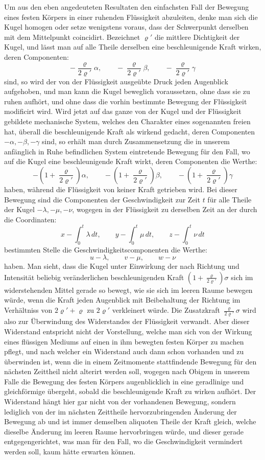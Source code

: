 \documentclass[11pt]{article}
\begin{document}
Um aus den eben angedeuteten Resultaten den einfachsten Fall der Bewegung eines festen Körpers in einer ruhenden Flüssigkeit abzuleiten, denke man sich die Kugel homogen oder setze wenigstens voraus, dass der Schwerpunkt derselben mit dem Mittelpunkt coincidirt. Bezeichnet $\varrho'$ die mittlere Dichtigkeit der Kugel, und lässt man auf alle Theile derselben eine beschleunigende Kraft wirken, deren Componenten:
\[
 -\frac{\varrho}{2\varrho'}\alpha,\qquad
 -\frac{\varrho}{2\varrho'}\beta,\qquad
 -\frac{\varrho}{2\varrho'}\gamma
\]
sind, so wird der von der Flüssigkeit ausgeübte Druck jeden Augenblick aufgehoben, und man kann die Kugel beweglich voraussetzen, ohne dass sie zu ruhen aufhört, und ohne dass die vorhin bestimmte Bewegung der Flüssigkeit modificirt wird. Wird jetzt auf das ganze von der Kugel und der Flüssigkeit gebildete mechanische System, welches den Charakter eines sogenannten freien hat, überall die beschleunigende Kraft als wirkend gedacht, deren Componenten $-\alpha,-\beta,-\gamma$ sind, so erhält man durch Zusammensetzung die in unserem anfänglich in Ruhe befindlichen System eintretende Bewegung für den Fall, wo auf die Kugel eine beschleunigende Kraft wirkt, deren Componenten die Werthe:
\[
 -\left(1+\frac{\varrho}{2\varrho'}\right)\alpha,\qquad
 -\left(1+\frac{\varrho}{2\varrho'}\right)\beta,\qquad
 -\left(1+\frac{\varrho}{2\varrho'}\right)\gamma
\]
haben, während die Flüssigkeit von keiner Kraft getrieben wird. Bei dieser Bewegung sind die Componenten der Geschwindigkeit zur Zeit $t$ für alle Theile der Kugel $-\lambda,-\mu,-\nu$, wogegen in der Flüssigkeit zu derselben Zeit an der durch die Coordinaten:
\[
 x-\int_0^t\lambda\,dt,
 \qquad y-\int_0^t\mu\,dt,
 \qquad z-\int_0^t\nu\,dt
\]
bestimmten Stelle die Geschwindigkeitscomponenten die Werthe:
\[
 u-\lambda,\qquad v-\mu,\qquad w-\nu
\]
haben. Man sieht, dass die Kugel unter Einwirkung der nach Richtung und Intensität beliebig veränderlichen beschleunigenden Kraft
$\left(1+\frac{\varrho}{2\varrho'}\right)\sigma$ sich im widerstehenden Mittel gerade so bewegt, wie sie sich im leeren Raume bewegen würde, wenn die Kraft jeden Augenblick mit Beibehaltung der Richtung im Verhältniss von $2\varrho'+\varrho$ zu $2\varrho'$ verkleinert würde. Die Zusatzkraft $\frac{\varrho}{2\varrho'}\sigma$ wird also zur Überwindung des Widerstandes der Flüssigkeit verwandt. Aber dieser Widerstand entspricht nicht der Vorstellung, welche man sich von der Wirkung eines flüssigen Mediums auf einen in ihm bewegten festen Körper zu machen pflegt, und nach welcher ein Widerstand auch dann schon vorhanden und zu überwinden ist, wenn die in einem Zeitmomente stattfindende Bewegung für den nächsten Zeittheil nicht alterirt werden soll, wogegen nach Obigem in unserem Falle die Bewegung des festen Körpers augenblicklich in eine geradlinige und gleichförmige übergeht, sobald die beschleunigende Kraft zu wirken aufhört. Der Widerstand hängt hier gar nicht von der vorhandenen Bewegung, sondern lediglich von der im nächsten Zeittheile hervorzubringenden Änderung der Bewegung ab und ist immer demselben aliquoten Theile der Kraft gleich, welche dieselbe Änderung im leeren Raume hervorbringen würde, und dieser gerade entgegengerichtet, was man für den Fall, wo die Geschwindigkeit vermindert werden soll, kaum hätte erwarten können.
\end{document}
